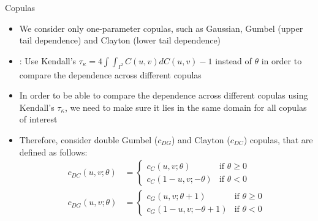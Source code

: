 \documentclass[9pt,xcolor=x11names,compress]{beamer}
\let\natbibcitep\citep
\renewcommand\citep{\bibpunct{(}{)}{;}{a}{,}{;}\natbibcitep}
\let\oldcite=\cite
\renewcommand{\cite}[1]{\textcolor{dblue}{\oldcite{#1}}}
\begin{document}
\begin{frame}{Copulas}
	\begin{itemize}
		\item We consider only one-parameter copulas, such as Gaussian, Gumbel (upper tail dependence) and Clayton (lower tail dependence)
		\item \cite{Almeida2012}: Use Kendall's $\tau_{\kappa}=4\int\int_{I^2}C(u,v)d C(u,v)-1$ \citep[see][]{Nelsen2006} instead of $\theta$ in order to compare the dependence across different copulas 
		\item In order to be able to compare the dependence across different copulas using Kendall's $\tau_{\kappa}$, we need to make sure it lies in the same domain for all copulas of interest
		\item Therefore, consider double Gumbel ($c_{DG}$) and Clayton ($c_{DC}$) copulas, that are defined as follows:
		\begin{align*}
		c_{DC}(u,v;\theta)&=\begin{cases}
		c_C(u,v;\theta) &\text{if }\theta\geq 0\\
		c_C(1-u,v;-\theta) &\text{if }\theta<0\end{cases}\\
		c_{DG}(u,v;\theta)&=\begin{cases}c_G(u,v;\theta+1) &\text{if } \theta\geq 0\\
		c_G(1-u,v;-\theta+1) &\text{if }\theta<0\end{cases}
		\end{align*}
	\end{itemize}
\end{frame}
\end{document}
